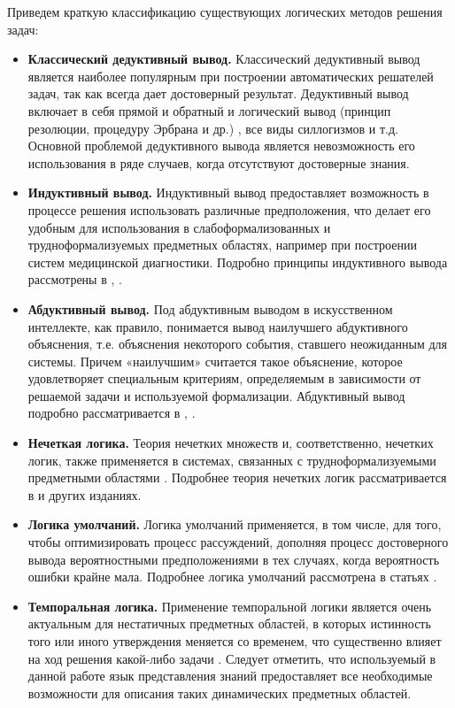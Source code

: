 Приведем краткую классификацию существующих логических методов решения задач:
\begin{itemize}
	\item{\textbf{Классический дедуктивный вывод.} Классический дедуктивный вывод является наиболее популярным при построении автоматических решателей задач, так как всегда дает достоверный результат. Дедуктивный вывод включает в себя прямой и обратный и логический вывод (принцип резолюции, процедуру Эрбрана и др.) \cite{vagin}, все виды силлогизмов \cite{syllogism} и т.д. Основной проблемой дедуктивного вывода является невозможность его использования в ряде случаев, когда отсутствуют достоверные знания.}
	\item{\textbf{Индуктивный вывод.} Индуктивный вывод предоставляет возможность в процессе решения использовать различные предположения, что делает его удобным для использования в слабоформализованных и трудноформализуемых предметных областях, например при построении систем медицинской диагностики. Подробно принципы индуктивного вывода рассмотрены в \cite{inductive_incompleteness}, \cite{inductive}.}
	\item{\textbf{Абдуктивный вывод.} Под абдуктивным выводом в искусственном интеллекте, как правило, понимается вывод наилучшего абдуктивного объяснения, т.е. объяснения некоторого события, ставшего неожиданным для системы. Причем «наилучшим»	считается такое объяснение, которое удовлетворяет специальным критериям, определяемым в зависимости от решаемой задачи и используемой	формализации. Абдуктивный вывод подробно рассматривается в \cite{abductive}, \cite{abductive_diagnistic}.}
	\item{\textbf{Нечеткая логика.} Теория нечетких множеств и, соответственно, нечетких логик, также применяется в системах, связанных с трудноформализуемыми предметными областями \cite{fuzzy_automobile} \cite{fuzzy_logic_picture}. Подробнее теория нечетких логик рассматривается в \cite{fuzzy_inference} и других изданиях.}
	\item{\textbf{Логика умолчаний.} Логика умолчаний применяется, в том числе, для того, чтобы оптимизировать процесс рассуждений,	дополняя процесс достоверного вывода вероятностными  предположениями в тех случаях, когда вероятность ошибки крайне мала. Подробнее логика умолчаний рассмотрена в статьях \cite{default_logic} \cite{default_logic2}.}
	\item{\textbf{Темпоральная логика.} Применение темпоральной логики является очень актуальным для нестатичных предметных областей, в которых истинность того или иного утверждения меняется со временем, что существенно влияет на ход решения какой-либо задачи \cite{temporal_logic2} \cite{temporal_logic}. Следует отметить, что используемый в данной работе язык представления знаний предоставляет все необходимые возможности для описания таких динамических предметных областей.}
\end{itemize}

